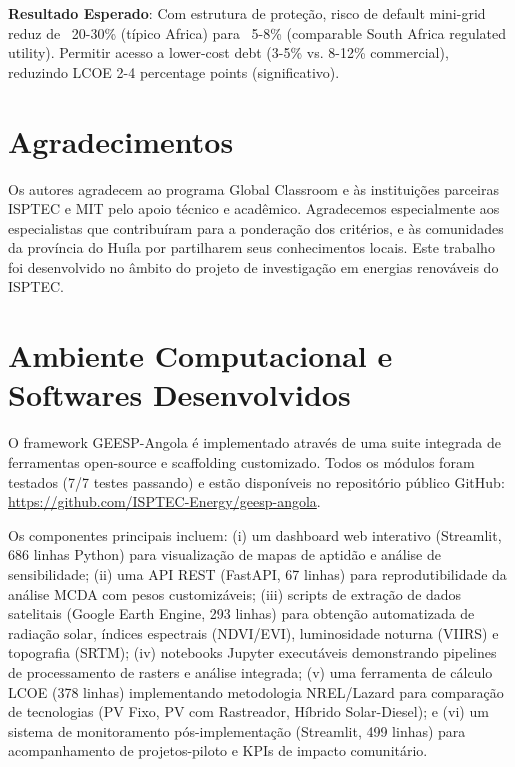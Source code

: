 \documentclass[12pt, a4paper]{article}
\begin{document}
\textbf{Resultado Esperado}: Com estrutura de proteção, risco de default mini-grid reduz de ~20-30\% (típico Africa) para ~5-8\% (comparable South Africa regulated utility). Permitir acesso a lower-cost debt (3-5\% vs. 8-12\% commercial), reduzindo LCOE 2-4 percentage points (significativo).

\section*{Agradecimentos}

Os autores agradecem ao programa Global Classroom e às instituições parceiras ISPTEC e MIT pelo apoio técnico e acadêmico. Agradecemos especialmente aos especialistas que contribuíram para a ponderação dos critérios, e às comunidades da província do Huíla por partilharem seus conhecimentos locais. Este trabalho foi desenvolvido no âmbito do projeto de investigação em energias renováveis do ISPTEC.




\appendix

\section{Ambiente Computacional e Softwares Desenvolvidos}

O framework GEESP-Angola é implementado através de uma suite integrada de ferramentas open-source e scaffolding customizado. Todos os módulos foram testados (7/7 testes passando) e estão disponíveis no repositório público GitHub: \url{https://github.com/ISPTEC-Energy/geesp-angola}.

Os componentes principais incluem: (i) um dashboard web interativo (Streamlit, 686 linhas Python) para visualização de mapas de aptidão e  análise de sensibilidade; (ii) uma API REST (FastAPI, 67 linhas) para reprodutibilidade da análise MCDA com pesos customizáveis; (iii) scripts de extração de dados satelitais (Google Earth Engine, 293 linhas) para obtenção automatizada de radiação solar, índices espectrais (NDVI/EVI), luminosidade noturna (VIIRS) e topografia (SRTM); (iv) notebooks Jupyter executáveis demonstrando pipelines de processamento de rasters e análise integrada; (v) uma ferramenta de cálculo LCOE (378 linhas) implementando metodologia NREL/Lazard para comparação de tecnologias (PV Fixo, PV com Rastreador, Híbrido Solar-Diesel); e (vi) um sistema de monitoramento pós-implementação (Streamlit, 499 linhas) para acompanhamento de projetos-piloto e KPIs de impacto comunitário.
\end{document}
